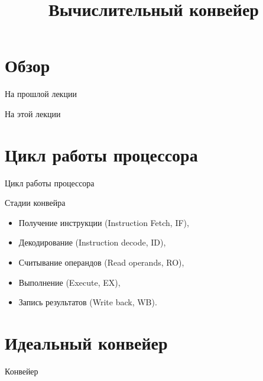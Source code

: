 

\title{Вычислительный конвейер}



\begin{frame}
\titlepage
\end{frame}

\section*{Обзор}

\begin{frame}{На прошлой лекции}
\end{frame}

\begin{frame}{На этой лекции}
\tableofcontents
\end{frame}

\section{Цикл работы процессора}

\begin{frame}{Цикл работы процессора}
\centering
{}
\end{frame}

\begin{frame}{Стадии конвейра}
\begin{itemize}
    \item Получение инструкции (Instruction Fetch, IF),
    \item Декодирование (Instruction decode, ID),
    \item Считывание операндов (Read operands, RO),
    \item Выполнение (Execute, EX),
    \item Запись результатов (Write back, WB).
\end{itemize}
\end{frame}

\section{Идеальный конвейер}

\begin{frame}{Конвейер}
\centering
{}
\end{frame}

